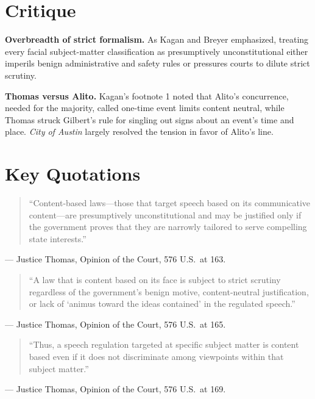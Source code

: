 \documentclass[12pt]{article}
\begin{document}
\section{Critique}

\textbf{Overbreadth of strict formalism.} As Kagan and Breyer emphasized, treating every facial subject-matter classification as presumptively unconstitutional either imperils benign administrative and safety rules or pressures courts to dilute strict scrutiny.

\textbf{Thomas versus Alito.} Kagan's footnote 1 noted that Alito's concurrence, needed for the majority, called one-time event limits content neutral, while Thomas struck Gilbert's rule for singling out signs about an event's time and place. \textit{City of Austin} largely resolved the tension in favor of Alito's line.

\section{Key Quotations}

\begin{quote}\sloppy
``Content-based laws---those that target speech based on its communicative content---are presumptively unconstitutional and may be justified only if the government proves that they are narrowly tailored to serve compelling state interests.''
\end{quote}
\noindent --- Justice Thomas, Opinion of the Court, 576 U.S.\ at 163.

\begin{quote}
``A law that is content based on its face is subject to strict scrutiny regardless of the government's benign motive, content-neutral justification, or lack of `animus toward the ideas contained' in the regulated speech.''
\end{quote}
\noindent --- Justice Thomas, Opinion of the Court, 576 U.S.\ at 165.

\begin{quote}
``Thus, a speech regulation targeted at specific subject matter is content based even if it does not discriminate among viewpoints within that subject matter.''
\end{quote}
\noindent --- Justice Thomas, Opinion of the Court, 576 U.S.\ at 169.
\end{document}
